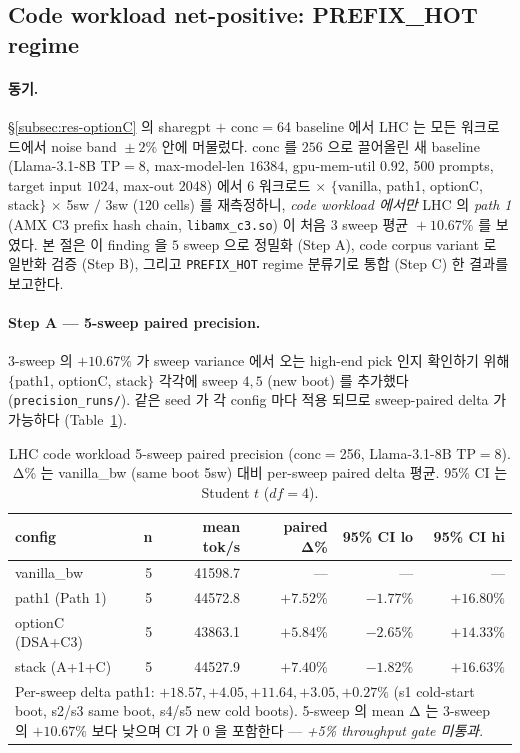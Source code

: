 {\subsection{Code workload net-positive: PREFIX\_HOT regime}
\label{subsec:res-lhc-code}

\paragraph{동기.}
\S\ref{subsec:res-optionC} 의 sharegpt $+$ conc$=$64 baseline 에서 LHC 는
모든 워크로드에서 noise band $\!\pm\!2\%$ 안에 머물렀다. conc 를 $256$ 으로
끌어올린 새 baseline (Llama-3.1-8B TP$=$8, max-model-len $16384$,
gpu-mem-util $0.92$, 500 prompts, target input $1024$, max-out $2048$) 에서
$6$ 워크로드 $\times$ $\{$vanilla, path1, optionC, stack$\}$ $\times$ 5sw $/$ 3sw
($120$ cells) 를 재측정하니, \emph{code workload 에서만} LHC 의
\emph{path 1} (AMX C3 prefix hash chain, \texttt{libamx\_c3.so}) 이
처음 $3$ sweep 평균 $\!+\!10.67\%$ 를 보였다. 본 절은 이 finding 을
$5$ sweep 으로 정밀화 (Step A), code corpus variant 로 일반화 검증
(Step B), 그리고 \texttt{PREFIX\_HOT} regime 분류기로 통합 (Step C) 한 결과를
보고한다.

\paragraph{Step A — 5-sweep paired precision.}
3-sweep 의 $+10.67\%$ 가 sweep variance 에서 오는 high-end pick 인지
확인하기 위해 $\{$path1, optionC, stack$\}$ 각각에 sweep $4, 5$ (new boot)
를 추가했다 (\texttt{precision\_runs/}). 같은 seed 가 각 config 마다 적용
되므로 sweep-paired delta 가 가능하다 (Table~\ref{tbl:lhc-code-precision}).

\begin{table}[t]
\centering
\small
\caption{LHC code workload 5-sweep paired precision (conc$=$256, Llama-3.1-8B
TP$=$8). Δ\% 는 vanilla\_bw (same boot 5sw) 대비 per-sweep paired delta 평균.
95\% CI 는 Student $t$ ($df\!=\!4$).}
\label{tbl:lhc-code-precision}
\begin{tabular}{lrrrrr}
\toprule
config & n & mean tok/s & paired Δ\% & 95\% CI lo & 95\% CI hi \\
\midrule
vanilla\_bw       & 5 & 41598.7 & ---        & ---     & ---     \\
path1 (Path 1)    & 5 & 44572.8 & $+7.52\%$  & $-1.77\%$ & $+16.80\%$ \\
optionC (DSA+C3)  & 5 & 43863.1 & $+5.84\%$  & $-2.65\%$ & $+14.33\%$ \\
stack (A+1+C)     & 5 & 44527.9 & $+7.40\%$  & $-1.82\%$ & $+16.63\%$ \\
\bottomrule
\multicolumn{6}{p{0.95\columnwidth}}{\footnotesize Per-sweep delta path1:
$+18.57, +4.05, +11.64, +3.05, +0.27\%$ (s1 cold-start boot, s2/s3 same boot,
s4/s5 new cold boots). 5-sweep 의 mean Δ 는 3-sweep 의 $+10.67\%$ 보다 낮으며
CI 가 $0$ 을 포함한다 — \emph{+5\% throughput gate 미통과}.}
\end{tabular}
\end{table}

}
